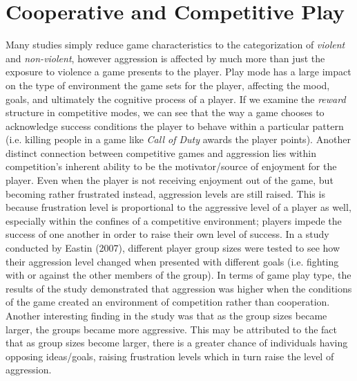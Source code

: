 \documentclass[12pt]{report}
\begin{document}
\section{Cooperative and Competitive Play}
Many studies simply reduce game characteristics to the categorization of \textit{violent} and \textit{non-violent}, however aggression is affected by much more than just the exposure to violence a game presents to the player. Play mode has a large impact on the type of environment the game sets for the player, affecting the mood, goals, and ultimately the cognitive process of a player. If we examine the \textit{reward} structure in competitive modes, we can see that the way a game chooses to acknowledge success conditions the player to behave within a particular pattern (i.e. killing people in a game like \textit{Call of Duty} awards the player points).\cite{Killing_Spree} Another distinct connection between competitive games and aggression lies within competition's inherent ability to be the motivator/source of enjoyment for the player. Even when the player is not receiving enjoyment out of the game, but becoming rather frustrated instead, aggression levels are still raised. This is because frustration level is proportional to the aggressive level of a player as well, especially within the confines of a competitive environment; players impede the success of one another in order to raise their own level of success.\cite{Killing_Spree} In a study conducted by Eastin (2007), different player group sizes were tested to see how their aggression level changed when presented with different goals (i.e. fighting with or against the other members of the group). In terms of game play type, the results of the study demonstrated that aggression was higher when the conditions of the game created an environment of competition rather than cooperation.\cite{Killing_Spree} Another interesting finding in the study was that as the group sizes became larger, the groups became more aggressive. This may be attributed to the fact that as group sizes become larger, there is a greater chance of individuals having opposing ideas/goals, raising frustration levels which in turn raise the level of aggression.
\end{document}
